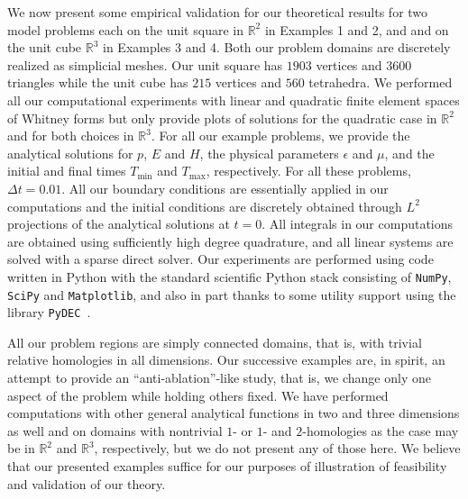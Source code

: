 \documentclass{amsart}
\theoremstyle{thmstyleone}%
\theoremstyle{thmstyletwo}%
\theoremstyle{thmstylethree}%
\def\R{\mathbb{R}}
\begin{document}
We now present some empirical validation for our theoretical results for two model problems each on the unit square in $\R^2$ in Examples 1 and 2, and and on the unit cube $\R^3$ in Examples 3 and 4. Both our problem domains are discretely realized as simplicial meshes. Our unit square has $1903$ vertices and $3600$ triangles while the unit cube has $215$ vertices and $560$ tetrahedra. We performed all our computational experiments with linear and quadratic finite element spaces of Whitney forms but only provide plots of solutions for the quadratic case in $\R^2$ and for both choices in $\R^3$. For all our example problems, we provide the analytical solutions for $p$, $E$ and $H$, the physical parameters $\epsilon$ and $\mu$, and the initial and final times $T_{\min}$ and $T_{\max}$, respectively. For all these problems, $\Delta t = 0.01$. All our boundary conditions are essentially applied in our computations and the initial conditions are discretely obtained through $L^2$ projections of the analytical solutions at $t = 0$. All integrals in our computations are obtained using sufficiently high degree quadrature, and all linear systems are solved with a sparse direct solver. Our experiments are performed using code written in Python with the standard scientific Python stack consisting of \texttt{NumPy}, \texttt{SciPy} and \texttt{Matplotlib}, and also in part thanks to some utility support using the library \texttt{PyDEC}~\cite{BeHi2012}.

All our problem regions are simply connected domains, that is, with trivial relative homologies in all dimensions. Our successive examples are, in spirit, an attempt to provide an ``anti-ablation''-like study, that is, we change only one aspect of the problem while holding others fixed. We have performed computations with other general analytical functions in two and three dimensions as well and on domains with nontrivial $1$- or $1$- and $2$-homologies as the case may be in $\R^2$ and $\R^3$, respectively, but we do not present any of those here. We  believe that our presented examples suffice for our purposes of illustration of feasibility and validation of our theory.
\end{document}

